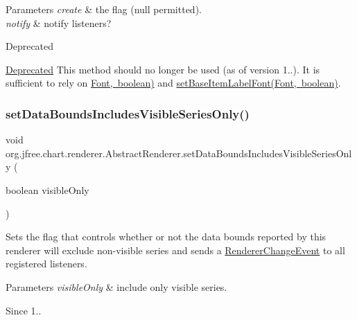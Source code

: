 \begin{DoxyParams}{Parameters}
{\em create} & the flag ({\ttfamily null} permitted). \\
\hline
{\em notify} & notify listeners?\\
\hline
\end{DoxyParams}
\begin{DoxyRefDesc}{Deprecated}
\item[\mbox{\hyperlink{deprecated__deprecated000145}{Deprecated}}]This method should no longer be used (as of version 1..). It is sufficient to rely on \mbox{\hyperlink{}{Font, boolean)}} and \mbox{\hyperlink{classorg_1_1jfree_1_1chart_1_1renderer_1_1_abstract_renderer_a4d629460f56707639561cf4296721553}{set\+Base\+Item\+Label\+Font(\+Font, boolean)}}. \end{DoxyRefDesc}
\mbox{\label{classorg_1_1jfree_1_1chart_1_1renderer_1_1_abstract_renderer_ace80fa7828b665fe121390ff732aa19d}} 
\subsubsection{\texorpdfstring{set\+Data\+Bounds\+Includes\+Visible\+Series\+Only()}{setDataBoundsIncludesVisibleSeriesOnly()}}
{\footnotesize\ttfamily void org.\+jfree.\+chart.\+renderer.\+Abstract\+Renderer.\+set\+Data\+Bounds\+Includes\+Visible\+Series\+Only (\begin{DoxyParamCaption}\item[{boolean}]{visible\+Only }\end{DoxyParamCaption})}

Sets the flag that controls whether or not the data bounds reported by this renderer will exclude non-\/visible series and sends a \mbox{\hyperlink{}{Renderer\+Change\+Event}} to all registered listeners.


\begin{DoxyParams}{Parameters}
{\em visible\+Only} & include only visible series.\\
\hline
\end{DoxyParams}
\begin{DoxySince}{Since}
1.. 
\end{DoxySince}
\mbox{\label{classorg_1_1jfree_1_1chart_1_1renderer_1_1_abstract_renderer_a9624eafc97ea32ccc5685bd6085b5fbf}} 
